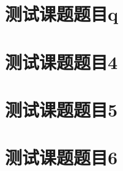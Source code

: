 \documentclass[color=blue]{textbook-cn}%
\begin{document}
\begin{Project}

\makeatletter

\section{测试课题题目q}




\section{测试课题题目4}


\begin{Case}
	\item\lipsum[1][1]
	\item\lipsum[1][1]
	\item\lipsum[1][1]
	\item\lipsum[1][1]
\end{Case}


\begin{Definition}[定义名称]
	
	\lipsum[1]
\end{Definition}











\section{测试课题题目5}

\begin{Definition}[定义名称]
\lipsum[1]
\end{Definition}




\section{测试课题题目6}


\lipsum[2]

\begin{Definition}[定义名称]
\lipsum[1]
\end{Definition}


\end{Project}
\end{document}
